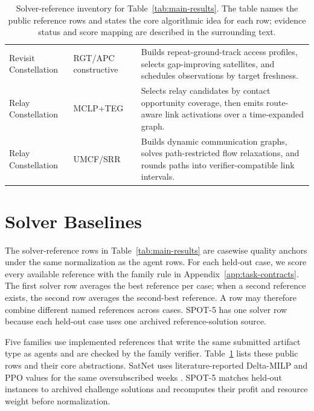 \documentclass[]{mosi}
\begin{document}
\begin{table}[!t]
\begin{tabular}{>{\raggedright\arraybackslash}p{}>{\raggedright\arraybackslash}p{}>{\raggedright\arraybackslash}p{}}
Revisit Constellation & RGT/APC constructive \citep{zhang2018leo,lee2020apc,mercado2025scheduling} & Builds repeat-ground-track access profiles, selects gap-improving satellites, and schedules observations by target freshness. \\
Relay Constellation & MCLP+TEG \citep{williams2026optimal,gerard2026contact} & Selects relay candidates by contact opportunity coverage, then emits route-aware link activations over a time-expanded graph. \\
Relay Constellation & UMCF/SRR \citep{grislain2022rethinking,lamothe2023dynamic} & Builds dynamic communication graphs, solves path-restricted flow relaxations, and rounds paths into verifier-compatible link intervals. \\
\hline
\end{tabular}
\caption{Solver-reference inventory for Table~\ref{tab:main-results}. The table names the public reference rows and states the core algorithmic idea for each row; evidence status and score mapping are described in the surrounding text.}
\label{tab:solver-baseline-inventory}
\end{table}

\section{Solver Baselines}
\label{app:solver-baselines}

The solver-reference rows in Table~\ref{tab:main-results} are casewise quality anchors under the same normalization as the agent rows. For each held-out case, we score every available reference with the family rule in Appendix~\ref{app:task-contracts}. The first solver row averages the best reference per case; when a second reference exists, the second row averages the second-best reference. A row may therefore combine different named references across cases. SPOT-5 has one solver row because each held-out case uses one archived reference-solution source.

Five families use implemented references that write the same submitted artifact type as agents and are checked by the family verifier. Table~\ref{tab:solver-baseline-inventory} lists these public rows and their core abstractions. SatNet uses literature-reported Delta-MILP and PPO values for the same oversubscribed weeks \citep{claudet2021delta,goh2022satnet}. SPOT-5 matches held-out instances to archived challenge solutions and recomputes their profit and resource weight before normalization.
\end{document}
